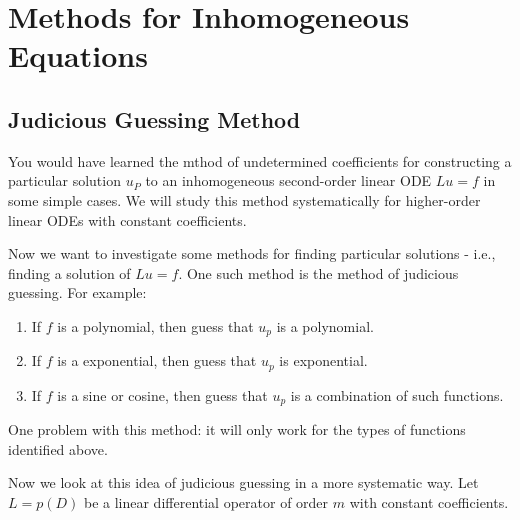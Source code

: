 \section{Methods for Inhomogeneous Equations}
\subsection{Judicious Guessing Method}
You would have learned the mthod of undetermined coefficients for constructing a particular solution \(u_P\) to an inhomogeneous second-order linear ODE \(Lu = f\) in some simple cases. We will study this method systematically for higher-order linear ODEs with constant coefficients.


\bigskip
Now we want to investigate some methods for finding particular solutions - i.e., finding a solution of \(Lu = f\). One such method is the method of judicious guessing. For example:

\begin{enumerate}
    \item If \(f\) is a polynomial, then guess that \(u_p\) is a polynomial.
    \item If \(f\) is a exponential, then guess that \(u_p\) is exponential.
    \item If \(f\) is a sine or cosine, then guess that \(u_p\) is a combination of such functions.
\end{enumerate}

One problem with this method: it will only work for the types of functions identified above.


\bigskip
Now we look at this idea of judicious guessing in a more systematic way. Let \(L = p(D)\) be a linear differential operator of order \(m\) with constant coefficients.

